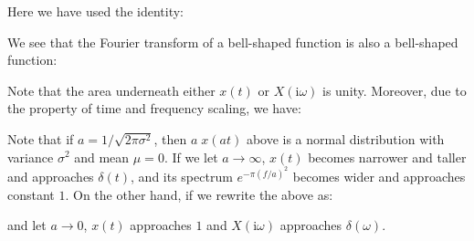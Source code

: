 \begin{enumerate}
	Here we have used the identity:
	
	We see that the Fourier transform of a bell-shaped function is also a bell-shaped function:
	
	Note that the area underneath either $x(t)$ or $X(\mathrm{i}\omega)$ is unity. Moreover, due to the property of time and frequency scaling, we have:
	
	Note that if $a=1/\sqrt{2\pi \sigma^2}$, then $a\;x(at)$ above is a normal distribution with variance $\sigma^2$ and mean $\mu=0$. If we let $a \rightarrow \infty$, $x(t)$ becomes narrower and taller and approaches $\delta(t)$, and its spectrum $e^{-\pi (f/a)^2}$ becomes wider and approaches constant $1$. On the other hand, if we rewrite the above as:
	
	and let $a \rightarrow 0$, $x(t)$ approaches $1$ and $X(\mathrm{i}\omega)$ approaches $\delta(\omega)$.
	\end{enumerate}
	
